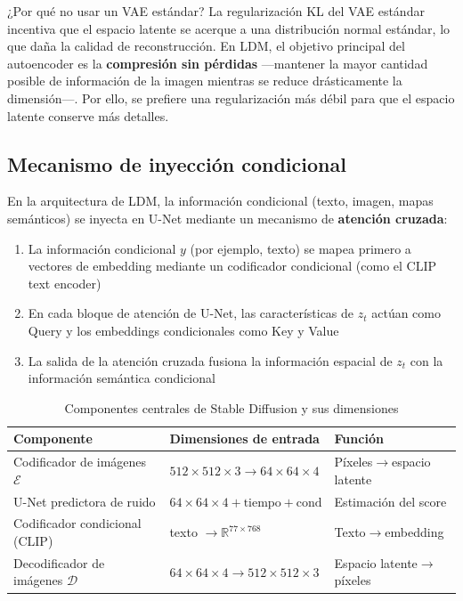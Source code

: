 \begin{knowledgebox}{¿Por qué no usar un VAE estándar?}
La regularización KL del VAE estándar incentiva que el espacio latente se acerque a una distribución normal estándar, lo que daña la calidad de reconstrucción. En LDM, el objetivo principal del autoencoder es la \textbf{compresión sin pérdidas} —mantener la mayor cantidad posible de información de la imagen mientras se reduce drásticamente la dimensión—. Por ello, se prefiere una regularización más débil para que el espacio latente conserve más detalles.
\end{knowledgebox}

\subsection{Mecanismo de inyección condicional}

En la arquitectura de LDM, la información condicional (texto, imagen, mapas semánticos) se inyecta en U-Net mediante un mecanismo de \textbf{atención cruzada}:

\begin{enumerate}
    \item La información condicional $y$ (por ejemplo, texto) se mapea primero a vectores de embedding mediante un codificador condicional (como el CLIP text encoder)
    \item En cada bloque de atención de U-Net, las características de $z_t$ actúan como Query y los embeddings condicionales como Key y Value
    \item La salida de la atención cruzada fusiona la información espacial de $z_t$ con la información semántica condicional
\end{enumerate}

\begin{table}[H]
\centering
\begin{tabular}{lll}
\toprule
\textbf{Componente} & \textbf{Dimensiones de entrada} & \textbf{Función} \\
\midrule
Codificador de imágenes $\mathcal{E}$ & $512\times512\times3 \to 64\times64\times4$ & Píxeles$\to$espacio latente \\
U-Net predictora de ruido & $64\times64\times4 + \text{tiempo} + \text{cond}$ & Estimación del score \\
Codificador condicional (CLIP) & texto $\to \mathbb{R}^{77\times768}$ & Texto$\to$embedding \\
Decodificador de imágenes $\mathcal{D}$ & $64\times64\times4 \to 512\times512\times3$ & Espacio latente$\to$píxeles \\
\bottomrule
\end{tabular}
\caption{Componentes centrales de Stable Diffusion y sus dimensiones}
\end{table}

